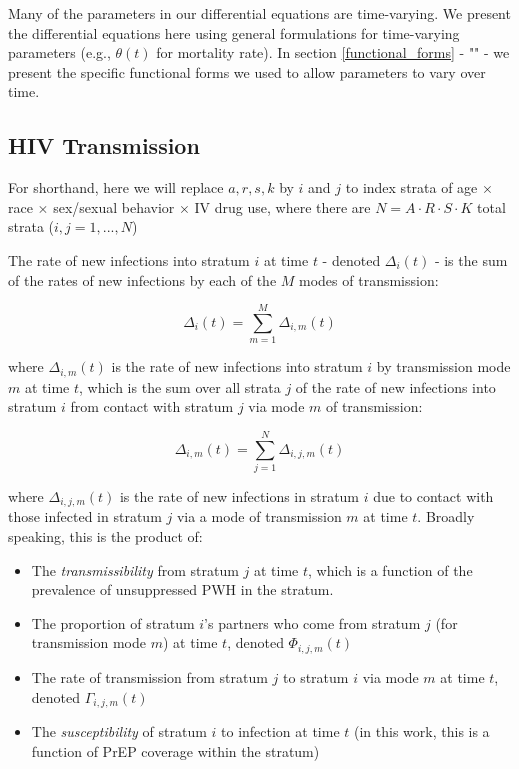 \documentclass{article}
\begin{document}
Many of the parameters in our differential equations are time-varying. We present the differential equations here using general formulations for time-varying parameters (e.g., $\theta(t)$ for mortality rate). In section \ref{functional_forms} - "" - we present the specific functional forms we used to allow parameters to vary over time. 


\subsection{HIV Transmission}\label{transmission}

For shorthand, here we will replace $a,r,s,k$ by $i$ and $j$ to index strata of age $\times$ race $\times$ sex/sexual behavior $\times$ IV drug use, where there are $N=A\cdot R \cdot S \cdot K$ total strata ($i,j = 1, ..., N$)
\newline
\newline

The rate of new infections into stratum $i$ at time $t$ - denoted $\Delta_i(t)$ - is the sum of the rates of new infections by each of the $M$ modes of transmission:

\begin{equation}
\Delta_i(t) = \sum_{m=1}^M \Delta_{i,m}(t)
\end{equation}

where $\Delta_{i,m}(t)$ is the rate of new infections into stratum $i$ by transmission mode $m$ at time $t$, which is the sum over all strata $j$ of the rate of new infections into stratum $i$ from contact with stratum $j$ via mode $m$ of transmission:

\begin{equation}
\Delta_{i,m}(t) = \sum_{j=1}^N \Delta_{i,j,m}(t)
\end{equation}

where $\Delta_{i,j,m}(t)$ is the rate of new infections in stratum $i$ due to contact with those infected in stratum $j$ via a mode of transmission $m$ at time $t$. Broadly speaking, this is the product of:

\begin{itemize}
	\item The \textit{transmissibility} from stratum $j$ at time $t$, which is a function of the prevalence of unsuppressed PWH in the stratum.
	\item The proportion of stratum $i$'s partners who come from stratum $j$ (for transmission mode $m$) at time $t$, denoted $\Phi_{i,j,m}(t)$
	\item The rate  of transmission from stratum $j$ to stratum $i$ via mode $m$ at time $t$, denoted $\Gamma_{i,j,m}(t)$
	\item The \textit{susceptibility} of stratum $i$ to infection at time $t$ (in this work, this is a function of PrEP coverage within the stratum)
\end{itemize}
\end{document}
